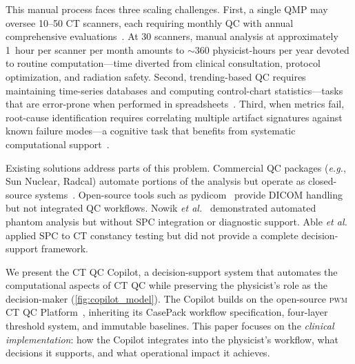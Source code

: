\documentclass[11pt]{article}
\newcommand{\pwm}{\textsc{pwm}}
\newcommand{\eg}{\textit{e.g.}}
\newcommand{\etal}{\textit{et al.}}
\begin{document}
This manual process faces three scaling challenges.
First, a single QMP may oversee 10--50 CT scanners, each requiring
monthly QC with annual comprehensive
evaluations~\cite{bushberg2012essential_physics}.
At 30 scanners, manual analysis at approximately 1~hour per scanner
per month amounts to $\sim$360 physicist-hours per year devoted to
routine computation---time diverted from clinical consultation,
protocol optimization, and radiation safety.
Second, trending-based QC requires maintaining time-series databases
and computing control-chart statistics---tasks that are error-prone
when performed in spreadsheets~\cite{pawlicki2005spc}.
Third, when metrics fail, root-cause identification requires
correlating multiple artifact signatures against known failure
modes---a cognitive task that benefits from systematic computational
support~\cite{hsieh2009computed_tomography}.

Existing solutions address parts of this problem.
Commercial QC packages (\eg, Sun Nuclear, Radcal) automate portions
of the analysis but operate as closed-source
systems~\cite{nowik2015ct_qa_automation}.
Open-source tools such as pydicom~\cite{pydicom} provide DICOM
handling but not integrated QC workflows.
Nowik \etal~\cite{nowik2015ct_qa_automation} demonstrated automated
phantom analysis but without SPC integration or diagnostic support.
Able \etal~\cite{able2016spc_ct} applied SPC to CT constancy testing
but did not provide a complete decision-support framework.

We present the CT QC Copilot, a decision-support system that
automates the computational aspects of CT QC while preserving the
physicist's role as the decision-maker (\cref{fig:copilot_model}).
The Copilot builds on the open-source \pwm{} CT QC
Platform~\cite{pwm_platform}, inheriting its CasePack workflow
specification, four-layer threshold system, and immutable baselines.
This paper focuses on the \emph{clinical implementation}: how the
Copilot integrates into the physicist's workflow, what decisions
it supports, and what operational impact it achieves.
\end{document}
